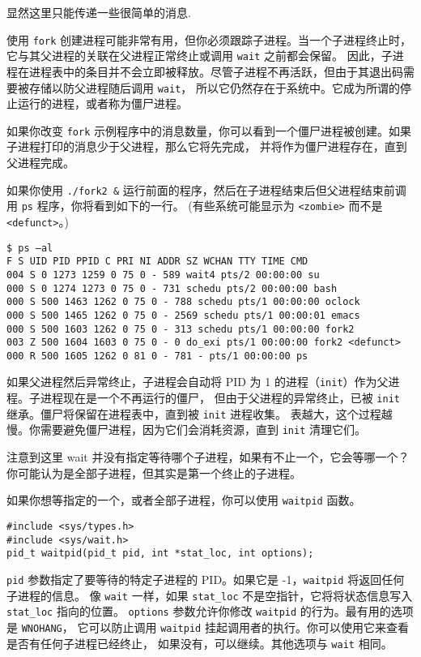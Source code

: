 \documentclass{ctexart}
\begin{document}
显然这里只能传递一些很简单的消息. 

使用 \texttt{fork} 创建进程可能非常有用，但你必须跟踪子进程。当一个子进程终止时，它与其父进程的关联在父进程正常终止或调用 \texttt{wait} 之前都会保留。
因此，子进程在进程表中的条目并不会立即被释放。尽管子进程不再活跃，但由于其退出码需要被存储以防父进程随后调用 \texttt{wait}，
所以它仍然存在于系统中。它成为所谓的停止运行的进程，或者称为僵尸进程。  
  
如果你改变 \texttt{fork} 示例程序中的消息数量，你可以看到一个僵尸进程被创建。如果子进程打印的消息少于父进程，那么它将先完成，
并将作为僵尸进程存在，直到父进程完成。  

如果你使用 \texttt{./fork2 \&} 运行前面的程序，然后在子进程结束后但父进程结束前调用 \texttt{ps} 程序，你将看到如下的一行。 
(有些系统可能显示为 \texttt{<zombie>} 而不是 \texttt{<defunct>}。)  
  
\begin{verbatim}  
$ ps –al  
F S UID PID PPID C PRI NI ADDR SZ WCHAN TTY TIME CMD  
004 S 0 1273 1259 0 75 0 - 589 wait4 pts/2 00:00:00 su  
000 S 0 1274 1273 0 75 0 - 731 schedu pts/2 00:00:00 bash  
000 S 500 1463 1262 0 75 0 - 788 schedu pts/1 00:00:00 oclock  
000 S 500 1465 1262 0 75 0 - 2569 schedu pts/1 00:00:01 emacs  
000 S 500 1603 1262 0 75 0 - 313 schedu pts/1 00:00:00 fork2  
003 Z 500 1604 1603 0 75 0 - 0 do_exi pts/1 00:00:00 fork2 <defunct>  
000 R 500 1605 1262 0 81 0 - 781 - pts/1 00:00:00 ps  
\end{verbatim}  
  
如果父进程然后异常终止，子进程会自动将 PID 为 1 的进程（\texttt{init}）作为父进程。子进程现在是一个不再运行的僵尸，
但由于父进程的异常终止，已被 \texttt{init} 继承。僵尸将保留在进程表中，直到被 \texttt{init} 进程收集。
表越大，这个过程越慢。你需要避免僵尸进程，因为它们会消耗资源，直到 \texttt{init} 清理它们。  

注意到这里 wait 并没有指定等待哪个子进程，如果有不止一个，它会等哪一个？你可能认为是全部子进程，但其实是第一个终止的子进程。

如果你想等指定的一个，或者全部子进程，你可以使用 \texttt{waitpid} 函数。
  
\begin{verbatim}  
#include <sys/types.h>  
#include <sys/wait.h>  
pid_t waitpid(pid_t pid, int *stat_loc, int options);  
\end{verbatim}  
  
\texttt{pid} 参数指定了要等待的特定子进程的 PID。如果它是 -1，\texttt{waitpid} 将返回任何子进程的信息。
像 \texttt{wait} 一样，如果 \texttt{stat\_loc} 不是空指针，它将将状态信息写入 \texttt{stat\_loc} 指向的位置。 
\texttt{options} 参数允许你修改 \texttt{waitpid} 的行为。最有用的选项是 \texttt{WNOHANG}，
它可以防止调用 \texttt{waitpid} 挂起调用者的执行。你可以使用它来查看是否有任何子进程已经终止，
如果没有，可以继续。其他选项与 \texttt{wait} 相同。  
  
\end{document}
